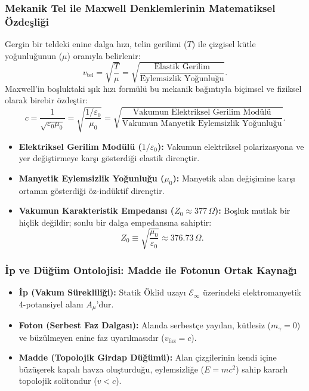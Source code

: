 \subsubsection{Mekanik Tel ile Maxwell Denklemlerinin Matematiksel Özdeşliği}
Gergin bir teldeki enine dalga hızı, telin gerilimi ($T$) ile çizgisel kütle yoğunluğunun ($\mu$) oranıyla belirlenir:
\begin{equation}
    v_{\mathrm{tel}} = \sqrt{\frac{T}{\mu}} = \sqrt{\frac{\text{Elastik Gerilim}}{\text{Eylemsizlik Yoğunluğu}}}.
    \label{eq:mekanik_tel_hizi}
\end{equation}
Maxwell'in boşluktaki ışık hızı formülü bu mekanik bağıntıyla biçimsel ve fiziksel olarak birebir özdeştir:
\begin{equation}
    c = \frac{1}{\sqrt{\varepsilon_0 \mu_0}} = \sqrt{\frac{1/\varepsilon_0}{\mu_0}} = \sqrt{\frac{\text{Vakumun Elektriksel Gerilim Modülü}}{\text{Vakumun Manyetik Eylemsizlik Yoğunluğu}}}.
    \label{eq:vakum_tel_ozdeslik}
\end{equation}
\begin{itemize}
    \item \textbf{Elektriksel Gerilim Modülü ($1/\varepsilon_0$):} Vakumun elektriksel polarizasyona ve yer değiştirmeye karşı gösterdiği elastik dirençtir.
    \item \textbf{Manyetik Eylemsizlik Yoğunluğu ($\mu_0$):} Manyetik alan değişimine karşı ortamın gösterdiği öz-indüktif dirençtir.
    \item \textbf{Vakumun Karakteristik Empedansı ($Z_0 \approx 377\,\Omega$):} Boşluk mutlak bir hiçlik değildir; sonlu bir dalga empedansına sahiptir:
          \begin{equation}
              Z_0 \equiv \sqrt{\frac{\mu_0}{\varepsilon_0}} \approx 376.73\,\Omega.
              \label{eq:vakum_empedansi_tanim}
          \end{equation}
\end{itemize}

\subsubsection{İp ve Düğüm Ontolojisi: Madde ile Fotonun Ortak Kaynağı}
\begin{itemize}
    \item \textbf{İp (Vakum Sürekliliği):} Statik Öklid uzayı $\mathcal{E}_\infty$ üzerindeki elektromanyetik 4-potansiyel alanı $A_\mu$'dur.
    \item \textbf{Foton (Serbest Faz Dalgası):} Alanda serbestçe yayılan, kütlesiz ($m_\gamma = 0$) ve büzülmeyen enine faz uyarılmasıdır ($v_{\mathrm{faz}} = c$).
    \item \textbf{Madde (Topolojik Girdap Düğümü):} Alan çizgilerinin kendi içine büzüşerek kapalı havza oluşturduğu, eylemsizliğe ($E = mc^2$) sahip kararlı topolojik solitondur ($v < c$).
\end{itemize}

